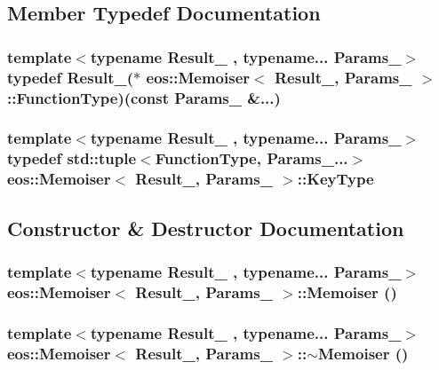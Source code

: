 \subsection{Member Typedef Documentation}
\hypertarget{classeos_1_1Memoiser_a402c1728aaaf3737722674ebf9cb0644}{
\subsubsection[{FunctionType}]{\setlength{\rightskip}{0pt plus 5cm}template$<$typename Result\_\- , typename... Params\_\-$>$ typedef Result\_\-($\ast$ {\bf eos::Memoiser}$<$ Result\_\-, Params\_\- $>$::{\bf FunctionType})(const Params\_\- \&...)}}
\label{classeos_1_1Memoiser_a402c1728aaaf3737722674ebf9cb0644}
\hypertarget{classeos_1_1Memoiser_aa17152256a324a1d43739567968c1736}{
\subsubsection[{KeyType}]{\setlength{\rightskip}{0pt plus 5cm}template$<$typename Result\_\- , typename... Params\_\-$>$ typedef std::tuple$<${\bf FunctionType}, Params\_\-...$>$ {\bf eos::Memoiser}$<$ Result\_\-, Params\_\- $>$::{\bf KeyType}}}
\label{classeos_1_1Memoiser_aa17152256a324a1d43739567968c1736}


\subsection{Constructor \& Destructor Documentation}
\hypertarget{classeos_1_1Memoiser_a85695c7a110fb1f7cda6dc8f0e0f311c}{
\subsubsection[{Memoiser}]{\setlength{\rightskip}{0pt plus 5cm}template$<$typename Result\_\- , typename... Params\_\-$>$ {\bf eos::Memoiser}$<$ Result\_\-, Params\_\- $>$::{\bf Memoiser} ()}}
\label{classeos_1_1Memoiser_a85695c7a110fb1f7cda6dc8f0e0f311c}
\hypertarget{classeos_1_1Memoiser_a5b4d3e39bc0d78776ca84f1ecfedb12f}{
\subsubsection[{$\sim$Memoiser}]{\setlength{\rightskip}{0pt plus 5cm}template$<$typename Result\_\- , typename... Params\_\-$>$ {\bf eos::Memoiser}$<$ Result\_\-, Params\_\- $>$::$\sim${\bf Memoiser} ()}}
\label{classeos_1_1Memoiser_a5b4d3e39bc0d78776ca84f1ecfedb12f}


